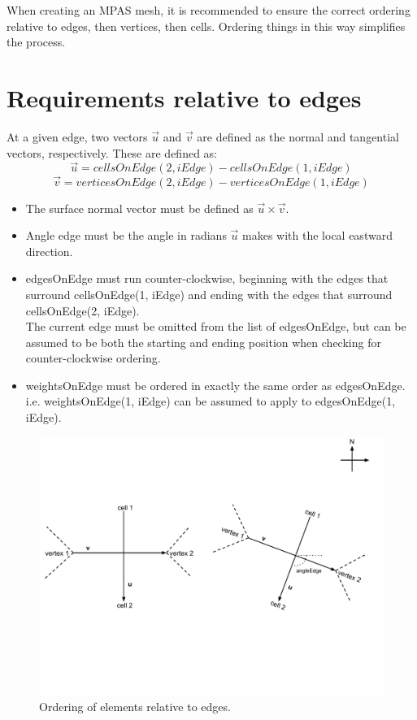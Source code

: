 \documentclass[11pt]{report}
\begin{document}
When creating an MPAS mesh, it is recommended to ensure the correct ordering
relative to edges, then vertices, then cells. Ordering things in this way
simplifies the process.

\section{Requirements relative to edges}

At a given edge, two vectors $\vec{u}$ and $\vec{v}$ are defined as the normal and tangential vectors, respectively. These are defined as:
\begin{equation}
	\vec{u} = cellsOnEdge(2, iEdge) - cellsOnEdge(1, iEdge)
\end{equation}
\begin{equation}
	\vec{v} = verticesOnEdge(2, iEdge) - verticesOnEdge(1, iEdge)
\end{equation}

\begin{itemize}
	\item The surface normal vector must be defined as $\vec{u} \times \vec{v}$.
	\item Angle edge must be the angle in radians $\vec{u}$ makes with the local eastward direction.
	\item edgesOnEdge must run counter-clockwise, beginning with the edges that surround cellsOnEdge(1, iEdge) and ending with the edges that surround cellsOnEdge(2, iEdge). \\
		  The current edge must be omitted from the list of edgesOnEdge, but can be assumed to be both the starting and ending position when checking for counter-clockwise ordering.
	\item weightsOnEdge must be ordered in exactly the same order as edgesOnEdge. i.e. weightsOnEdge(1, iEdge) can be assumed to apply to edgesOnEdge(1, iEdge).
\end{itemize}

\begin{figure}
	\centering
	\includegraphics[scale=0.4]{figures/Edge Diagram.pdf}
	\caption{Ordering of elements relative to edges.}
\end{figure}
\end{document}
